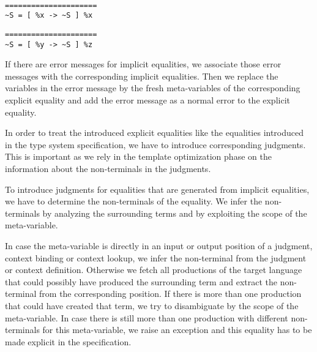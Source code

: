\begin{example}{~}
\newline
  \begin{minipage}[b]{.45\linewidth}
    \begin{lstlisting}[language=sltc]
=====================
~S = [ %x -> ~S ] %x
\end{lstlisting}
  \end{minipage}
  \begin{minipage}[b]{.45\linewidth}
    \begin{lstlisting}[language=sltc]
%y = %z
=====================
~S = [ %y -> ~S ] %z
\end{lstlisting}
  \end{minipage}
\label{ex:implicit-equalities}
\end{example}

If there are error messages for implicit equalities, we associate
those error messages with the corresponding implicit equalities. Then
we replace the variables in the error message by the fresh
meta-variables of the corresponding explicit equality and add the
error message as a normal error to the explicit equality.

In order to treat the introduced explicit equalities like the
equalities introduced in the type system specification, we have to
introduce corresponding judgments. This is important as we rely in the
template optimization phase on the information about the non-terminals
in the judgments.

To introduce judgments for equalities that are generated from implicit
equalities, we have to determine the non-terminals of the
equality. We infer the non-terminals by analyzing the surrounding
terms and by exploiting the scope of the meta-variable.

In case the meta-variable is directly in an input or output position
of a judgment, context binding or context lookup, we infer the
non-terminal from the judgment or context definition. Otherwise we
fetch all productions of the target language that could possibly have
produced the surrounding term and extract the non-terminal from the
corresponding position. If there is more than one production that
could have created that term, we try to disambiguate by the scope of
the meta-variable. In case there is still more than one production
with different non-terminals for this meta-variable, we raise an
exception and this equality has to be made explicit in the
specification.

